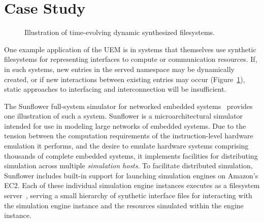 \documentclass{sig-alternate}
\begin{document}


\section{Case Study}
\begin{figure}
\hspace{0.1in}
\vspace{-0.1in}
\caption{Illustration of time-evolving dynamic synthesized filesystems.}
\label{fig:dynamicnamespace}
\end{figure}
One example application of the UEM is in systems that themselves
use synthetic filesystems for representing interfaces to compute
or communication resources. If, in such systems, new entries in the
served namespace may be dynamically created, or if new interactions
between existing entries may occur (Figure~\ref{fig:dynamicnamespace}),
static approaches to interfacing and interconnection will be insufficient.

The Sunflower full-system simulator for networked embedded
systems~\cite{StanleyMarbell:hipeac07} provides one illustration
of such a system. Sunflower is a microarchitectural simulator
intended for use in modeling large networks of embedded systems.
Due to the tension between the computation requirements of the
instruction-level hardware emulation it performs, and the desire
to emulate hardware systems comprising thousands of complete embedded
systems, it implements facilities for distributing simulation across
multiple {\it simulation hosts}. To facilitate distributed simulation,
Sunflower includes built-in support for launching simulation engines
on Amazon's EC2. Each of these individual simulation engine instances
executes as a filesystem server~\cite{StanleyMarbell:iwp906a},
serving a small hierarchy of synthetic interface files for interacting
with the simulation engine instance and the resources simulated
within the engine instance.
\end{document}
